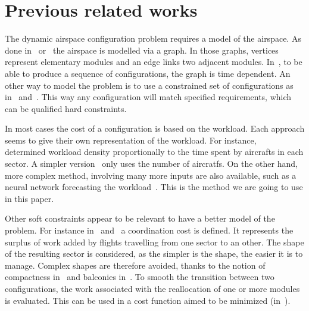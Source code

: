 \documentclass[twoside,twocolumn]{article}
\begin{document}
\section{Previous related works}
\label{sec:previous_related_works}

The dynamic airspace configuration problem requires a model of the airspace. As
done in~\cite{sergeeva2017dynamic} or~\cite{treimuth2016branch} the airspace
is modelled via a graph. In those graphs, vertices represent elementary modules
and an edge links two adjacent modules. In~\cite{treimuth2016branch}, to be
able to produce a sequence of configurations, the graph is time dependent.
An other way to model the problem is to use a constrained set of
configurations as in~\cite{gianazza2010forecasting} and~\cite{bloem2010dynamic}.
This way any configuration will match specified requirements, which can be
qualified hard constraints.

In most cases the cost of a configuration is based on the workload. Each
approach seems to give their own representation of the workload. For instance,
~\cite{bedouet2016} determined workload density proportionally to the time
spent by aircrafts in each sector. A simpler version~\cite{sergeeva2017dynamic}
only uses the number of aircratfs. On the other hand, more complex method,
involving many more inputs are also available, such as a neural network
forecasting the workload~\cite{gianazza2010forecasting}. This is the method we
are going to use in this paper.

Other soft constraints appear to be relevant to have a better model of
the problem. For instance in~\cite{sergeeva2017dynamic} and~\cite{bedouet2016} a
coordination cost is defined. It represents the surplus of work added by
flights travelling from one sector to an other. The shape of the
resulting sector is considered, as the simpler is
the shape, the easier it is to manage. Complex shapes are therefore avoided,
thanks to the notion of compactness in~\cite{jagare2013constraint} and balconies
in~\cite{sergeeva2017dynamic}. To smooth the transition between two
configurations, the work associated with the reallocation of one or more modules
is evaluated. This can be used in a cost function aimed to be minimized
(in~\cite{bedouet2016}).






\end{document}

